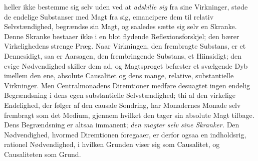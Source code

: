 \documentclass[12pt]{book}
\begin{document}
heller ikke bestemme sig selv uden ved at \emph{adskille sig} fra sine Virkninger,
støde de endelige Substanser med Magt fra sig, emancipere dem til relativ
Selvstændighed, begrændse sin Magt, og saaledes sætte sig selv en Skranke. Denne
Skranke bestaaer ikke i en blot flydende Reflexionsforskjel; den bærer Virkelighedens
strenge Præg. Naar Virkningen, den frembragte Substans, er et Dennesidigt, saa er
Aarsagen, den frembringende Substans, et Hiinsidigt; den evige Nødvendighed skiller dem
ad, og Magtsproget befæster et svælgende Dyb imellem den ene, absolute Causalitet og
dens mange, relative, substantielle Virkninger. Men Centralmonadens Diremtioner medføre
desuagtet ingen endelig Begrændsning i dens egen substantielle Selvstændighed; thi al
den virkelige Endelighed, der følger af den causale Sondring, har Monadernes Monade
selv frembragt som det Medium, gjennem hvilket den tager sin absolute Magt tilbage.
Dens Begrændsning er altsaa immanent; \emph{den magter selv sine Skranker.} Den
Nødvendighed, hvormed Diremtionen foregaaer, er derfor ogsaa en indholdsrig, rationel
Nødvendighed, i hvilken Grunden viser sig som Causalitet, og Causaliteten som Grund.
\end{document}
